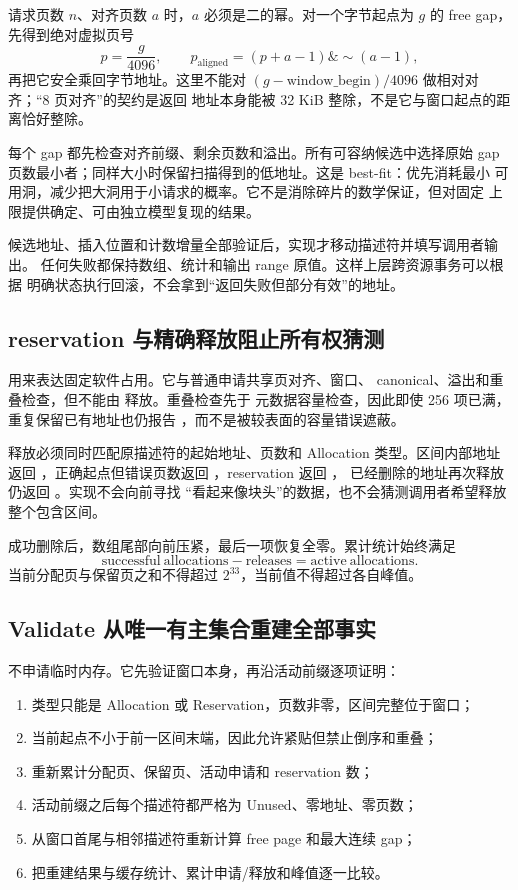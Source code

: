 请求页数 \(n\)、对齐页数 \(a\) 时，\(a\) 必须是二的幂。对一个字节起点为
\(g\) 的 free gap，先得到绝对虚拟页号
\[
 p=\frac{g}{4096},
 \qquad
 p_{\mathrm{aligned}}=(p+a-1)\mathbin{\&}\sim(a-1),
\]
再把它安全乘回字节地址。这里不能对
\((g-\mathrm{window\_begin})/4096\) 做相对对齐；“8 页对齐”的契约是返回
地址本身能被 32 KiB 整除，不是它与窗口起点的距离恰好整除。

每个 gap 都先检查对齐前缀、剩余页数和溢出。所有可容纳候选中选择原始 gap
页数最小者；同样大小时保留扫描得到的低地址。这是 best-fit：优先消耗最小
可用洞，减少把大洞用于小请求的概率。它不是消除碎片的数学保证，但对固定
上限提供确定、可由独立模型复现的结果。

候选地址、插入位置和计数增量全部验证后，实现才移动描述符并填写调用者输出。
任何失败都保持数组、统计和输出 range 原值。这样上层跨资源事务可以根据
明确状态执行回滚，不会拿到“返回失败但部分有效”的地址。

\subsection{reservation 与精确释放阻止所有权猜测}

 用来表达固定软件占用。它与普通申请共享页对齐、窗口、
canonical、溢出和重叠检查，但不能由  释放。重叠检查先于
元数据容量检查，因此即使 256 项已满，重复保留已有地址也仍报告
，而不是被较表面的容量错误遮蔽。

释放必须同时匹配原描述符的起始地址、页数和 Allocation 类型。区间内部地址
返回 ，正确起点但错误页数返回
，reservation 返回 ，
已经删除的地址再次释放仍返回 。实现不会向前寻找
“看起来像块头”的数据，也不会猜测调用者希望释放整个包含区间。

成功删除后，数组尾部向前压紧，最后一项恢复全零。累计统计始终满足
\[
 \mathrm{successful\ allocations}
 -
 \mathrm{releases}
 =
 \mathrm{active\ allocations}.
\]
当前分配页与保留页之和不得超过 \(2^{33}\)，当前值不得超过各自峰值。

\subsection{Validate 从唯一有主集合重建全部事实}

 不申请临时内存。它先验证窗口本身，再沿活动前缀逐项证明：

\begin{enumerate}[label=\arabic*.]
  \item 类型只能是 Allocation 或 Reservation，页数非零，区间完整位于窗口；
  \item 当前起点不小于前一区间末端，因此允许紧贴但禁止倒序和重叠；
  \item 重新累计分配页、保留页、活动申请和 reservation 数；
  \item 活动前缀之后每个描述符都严格为 Unused、零地址、零页数；
  \item 从窗口首尾与相邻描述符重新计算 free page 和最大连续 gap；
  \item 把重建结果与缓存统计、累计申请/释放和峰值逐一比较。
\end{enumerate}

